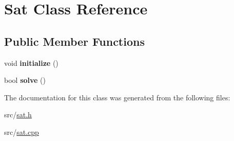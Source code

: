 \hypertarget{classSat}{\section{Sat Class Reference}
\label{classSat}
}
\subsection*{Public Member Functions}
\begin{DoxyCompactItemize}
\item 
\hypertarget{classSat_ac7fd375deeb1c2028c883ba566f075de}{void {\bfseries initialize} ()}\label{classSat_ac7fd375deeb1c2028c883ba566f075de}

\item 
\hypertarget{classSat_af228f844eae4cebef317d23c17e8fbd4}{bool {\bfseries solve} ()}\label{classSat_af228f844eae4cebef317d23c17e8fbd4}

\end{DoxyCompactItemize}


The documentation for this class was generated from the following files\+:\begin{DoxyCompactItemize}
\item 
src/\hyperlink{sat_8h}{sat.\+h}\item 
src/\hyperlink{sat_8cpp}{sat.\+cpp}\end{DoxyCompactItemize}
